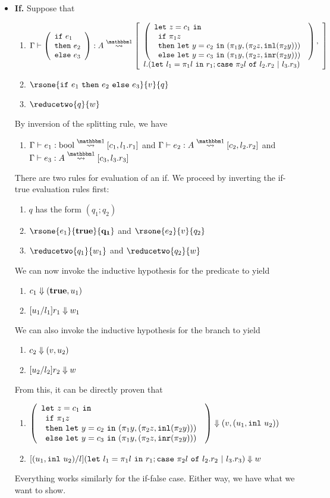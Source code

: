 \documentclass{article}
\begin{document}
\begin{itemize}
\item {\bf If.} Suppose that
\begin{enumerate}
\item $\splitone {\left( \tallif {e_1}{e_2}{e_3} \right)}{A} 
								{\begin{array}{l}
									\left(
										\talllet{z}{c_1}{
										\tallif {\pi_1 z}
										{\letin{y}{c_2}{(\pi_1 y, (\pi_2 z, \inl(\pi_2 y)))}}
										{\letin{y}{c_3}{(\pi_1 y, (\pi_2 z, \inr(\pi_2 y)))}}
									}\right), \\
									l.(\letin{l_1}{\pi_1 l}{r_1};\caseof{\pi_2 l}{l_2.r_2}{l_3.r_3})
								\end{array}}$
\item $\rsone{\ifthen {e_1}{e_2}{e_3}}{v}{q}$
\item $\reducetwo{q}{w}$
\end{enumerate}
By inversion of the splitting rule, we have
\begin{enumerate}
\item $\splitonesub 1 \rmbool$ and $\splitonesub 2 A$ and $\splitonesub 3 A$
\end{enumerate}
There are two rules for evaluation of an if.  We proceed by inverting the if-true evaluation rules first:
\begin{enumerate}
\item $q$ has the form $(q_1;q_2)$
\item $\rsone{e_1}{\bf true}{q_1}$ and $\rsone{e_2}{v}{q_2}$
\item $\reducetwo{q_1}{w_1}$ and $\reducetwo{q_2}{w}$
\end{enumerate}
We can now invoke the inductive hypothesis for the predicate to yield
\begin{enumerate}
\item ${c_1} \Downarrow {({\bf true},{u_1})}$
\item ${[u_1/l_1]r_1} \Downarrow {w_1}$
\end{enumerate}
We can also invoke the inductive hypothesis for the branch to yield
\begin{enumerate}
\item ${c_2} \Downarrow {({v},{u_2})}$
\item ${[u_2/l_2]r_2} \Downarrow {w}$
\end{enumerate}
From this, it can be directly proven that
\begin{enumerate}
\item ${
		\left(
			\begin{array}{l} {\tt let}~{z} = {c_1}~{\tt in} \\ {
			\begin{array}{l} {\tt if}~{\pi_1 z} \\{\tt then}~{{\tt let}~{y} = {c_2}~{\tt in}~{(\pi_1 y, (\pi_2 z, {\tt inl}(\pi_2 y)))}}\\{\tt else}~{{\tt let}~{y} = {c_3}~{\tt in}~{(\pi_1 y, (\pi_2 z, {\tt inr}(\pi_2 y)))}} \end{array}
		}\end{array}\right)} \Downarrow {({v},{({u_1},{{\tt inl}~u_2})})}$
\item ${[({u_1},{{\tt inl}~u_2})/l]({\tt let}~{l_1} = {\pi_1 l}~{\tt in}~{r_1};{\tt case}~{\pi_2 l} ~{\tt of}~{l_2.r_2}~{\tt |}~{l_3.r_3})} \Downarrow {w}$
\end{enumerate}
Everything works similarly for the if-false case.  Either way, we have what we want to show.


\end{itemize}
\end{document}
